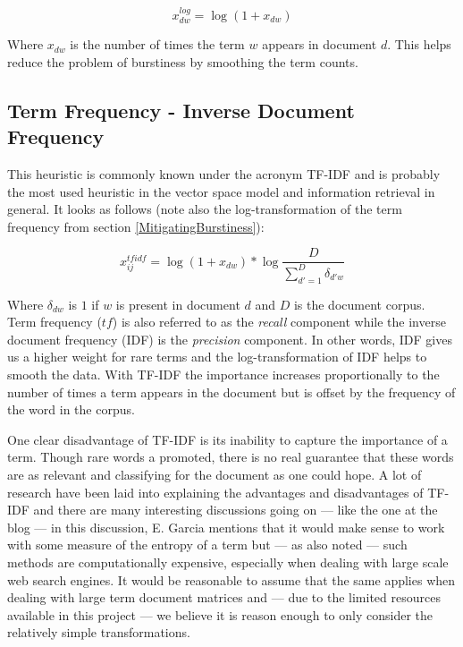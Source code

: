 \[
x_{dw}^{log} = \log{(1 + x_{dw})}
\]

Where $x_{dw}$ is the number of times the term $w$ appears in document
$d$. This helps reduce the problem of burstiness by smoothing
 the term counts.

\subsection{Term Frequency - Inverse Document Frequency\label{TFIDF}}

This heuristic is commonly known under the acronym TF-IDF and is
probably the most used heuristic in the vector space model and
information retrieval in general. It looks as follows (note also the
log-transformation of the term frequency from
section \ref{MitigatingBurstiness}):

\[
x_{ij}^{tfidf} = \log{(1 + x_{dw})} * \log{\frac{D}{\sum_{d\prime = 1}^{D}\delta_{d\prime w}} }
\]

Where $\delta_{dw}$ is $1$ if $w$ is present in document $d$ and $D$
is the document corpus. Term frequency ($\mathit{tf}$) is also referred to as the
\textit{recall} component while the inverse document frequency (IDF)
is the \textit{precision} component. In other words, IDF gives us a
higher weight for rare terms and the log-transformation of IDF helps
to smooth  the data. With TF-IDF the importance increases
proportionally to the number of times a term appears in the document
but is offset by the frequency of the word in the corpus.

One clear disadvantage of TF-IDF is its inability to capture the
importance of a term. Though rare words a promoted, there is no real
guarantee that these words are as relevant and classifying for the
document as one could hope. A lot of research have been laid into
explaining the advantages and disadvantages of TF-IDF and there are
many interesting discussions going on --- like the one at the blog
\cite{UnderstandingTFIDF} --- in this discussion, E. Garcia mentions
that it would make sense to work with some measure of the entropy of a
term but --- as also noted --- such methods are computationally
expensive, especially when dealing with large scale web search
engines. It would be reasonable to assume that the same applies when
dealing with large term document matrices and --- due to the limited
resources available in this project --- we believe it is reason enough
to only consider the relatively simple transformations.

